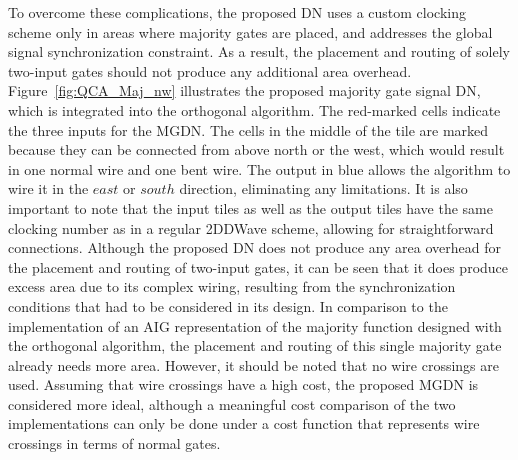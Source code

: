 To overcome these complications, the proposed DN uses a custom clocking scheme only in areas where majority gates are placed, and addresses the global signal synchronization constraint. As a result, the placement and routing of solely two-input gates should not produce any additional area overhead. Figure~\ref{fig:QCA_Maj_nw} illustrates the proposed majority gate signal DN, which is integrated into the orthogonal algorithm. The red-marked cells indicate the three inputs for the MGDN. The cells in the middle of the tile are marked because they can be connected from above north or the west, which would result in one normal wire and one bent wire. The output in blue allows the algorithm to wire it in the $east$ or $south$ direction, eliminating any limitations. It is also important to note that the input tiles as well as the output tiles have the same clocking number as in a regular 2DDWave scheme, allowing for straightforward connections. Although the proposed DN does not produce any area overhead for the placement and routing of two-input gates, it can be seen that it does produce excess area due to its complex wiring, resulting from the synchronization conditions that had to be considered in its design. In comparison to the implementation of an AIG representation of the majority function designed with the orthogonal algorithm, the placement and routing of this single majority gate already needs more area. However, it should be noted that no wire crossings are used. Assuming that wire crossings have a high cost, the proposed MGDN is considered more ideal, although a meaningful cost comparison of the two implementations can only be done under a cost function that represents wire crossings in terms of normal gates.

